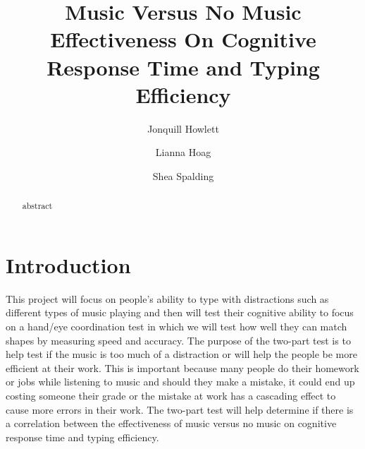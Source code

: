 \documentclass[sigconf]{acmart}
\begin{document}
\title{Music Versus No Music Effectiveness On Cognitive Response Time and Typing Efficiency}

\author{Jonquill Howlett}

\author{Lianna Hoag}

\author{Shea Spalding}

\renewcommand{\shortauthors}{J. Howlett} %

\begin{abstract}
abstract
\end{abstract}

\maketitle

\section{Introduction}
This project will focus on people's ability to type with distractions such as different types of music playing and then will test their cognitive ability to focus on a hand/eye coordination test in which we will test how well they can match shapes by measuring speed and accuracy. 
The purpose of the two-part test is to help test if the music is too much of a distraction or will help the people be more efficient at their work. 
This is important because many people do their homework or jobs while listening to music and should they make a mistake, it could end up costing someone their grade or the mistake at work has a cascading effect to cause more errors in their work. 
The two-part test will help determine if there is a correlation between the effectiveness of music versus no music on cognitive response time and typing efficiency.
\end{document}
